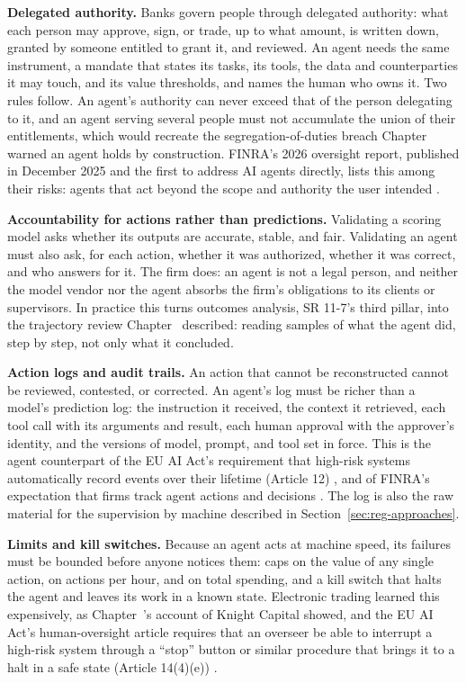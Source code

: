 \documentclass[../ai_in_finance]{subfiles}
\begin{document}
\textbf{Delegated authority.} Banks govern people through delegated authority: what each person may approve, sign, or trade, up to what amount, is written down, granted by someone entitled to grant it, and reviewed. An agent needs the same instrument, a mandate that states its tasks, its tools, the data and counterparties it may touch, and its value thresholds, and names the human who owns it. Two rules follow. An agent's authority can never exceed that of the person delegating to it, and an agent serving several people must not accumulate the union of their entitlements, which would recreate the segregation-of-duties breach Chapter~ warned an agent holds by construction. FINRA's 2026 oversight report, published in December 2025 and the first to address AI agents directly, lists this among their risks: agents that act beyond the scope and authority the user intended \parencite{finra2026oversight}.

\textbf{Accountability for actions rather than predictions.} Validating a scoring model asks whether its outputs are accurate, stable, and fair. Validating an agent must also ask, for each action, whether it was authorized, whether it was correct, and who answers for it. The firm does: an agent is not a legal person, and neither the model vendor nor the agent absorbs the firm's obligations to its clients or supervisors. In practice this turns outcomes analysis, SR 11-7's third pillar, into the trajectory review Chapter~ described: reading samples of what the agent did, step by step, not only what it concluded.

\textbf{Action logs and audit trails.} An action that cannot be reconstructed cannot be reviewed, contested, or corrected. An agent's log must be richer than a model's prediction log: the instruction it received, the context it retrieved, each tool call with its arguments and result, each human approval with the approver's identity, and the versions of model, prompt, and tool set in force. This is the agent counterpart of the EU AI Act's requirement that high-risk systems automatically record events over their lifetime (Article 12) \parencite{eu2024aiact}, and of FINRA's expectation that firms track agent actions and decisions \parencite{finra2026oversight}. The log is also the raw material for the supervision by machine described in Section~\ref{sec:reg-approaches}.

\textbf{Limits and kill switches.} Because an agent acts at machine speed, its failures must be bounded before anyone notices them: caps on the value of any single action, on actions per hour, and on total spending, and a kill switch that halts the agent and leaves its work in a known state. Electronic trading learned this expensively, as Chapter~'s account of Knight Capital showed, and the EU AI Act's human-oversight article requires that an overseer be able to interrupt a high-risk system through a ``stop'' button or similar procedure that brings it to a halt in a safe state (Article 14(4)(e)) \parencite{eu2024aiact}.
\end{document}
